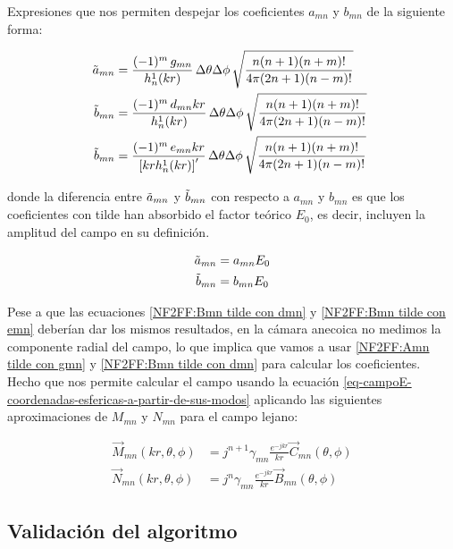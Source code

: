 \newpage

Expresiones que nos permiten despejar los coeficientes $a_{mn}$ y $b_{mn}$ de la siguiente forma:

\begin{align}
    \Tilde{a}_{mn} &= \frac{(-1)^m \, g_{mn}}{h^{1}_n(k r)} \,\Delta\theta \Delta\phi \, \sqrt{\frac{n(n + 1)(n + m)!}{4\pi(2n + 1)(n - m)!}}\ \label{NF2FF:Amn tilde con gmn} \\
\Tilde{b}_{mn} &= \frac{(-1)^m \, d_{mn} kr}{h^{1}_n(k r)} \,\Delta\theta \Delta\phi \, \sqrt{\frac{n(n + 1)(n + m)!}{4\pi(2n + 1)(n - m)!}}\ \label{NF2FF:Bmn tilde con dmn} \\
\Tilde{b}_{mn} &= \frac{(-1)^m \, e_{mn} kr}{\left[kr h^{1}_n(kr)\right]'} \,\Delta\theta \Delta\phi \, \sqrt{\frac{n(n + 1)(n + m)!}{4\pi(2n + 1)(n - m)!}}\ \label{NF2FF:Bmn tilde con emn} 
\end{align}

\noindent
donde la diferencia entre $\Tilde{a}_{mn}$ y $\Tilde{b}_{mn}$ con respecto a $a_{mn}$ y $b_{mn}$ es que los coeficientes con tilde han absorbido el factor teórico $E_0$, es decir, incluyen la amplitud del campo en su definición.

\begin{align}
    \Tilde{a}_{mn} &= a_{mn} E_{0} \\
    \Tilde{b}_{mn} &= b_{mn} E_{0}
\end{align}

\noindent
Pese a que las ecuaciones \eqref{NF2FF:Bmn tilde con dmn} y \eqref{NF2FF:Bmn tilde con emn} deberían dar los mismos resultados, en la cámara anecoica no medimos la componente radial del campo, lo que implica que vamos a usar \eqref{NF2FF:Amn tilde con gmn} y \eqref{NF2FF:Bmn tilde con dmn} para calcular los coeficientes. Hecho que nos permite calcular el campo usando la ecuación \eqref{eq-campoE-coordenadas-esfericas-a-partir-de-sus-modos} aplicando las siguientes aproximaciones de $M_{mn}$ y $N_{mn}$ para el campo lejano:

\begin{align}
\vec{M}_{mn}(kr, \theta, \phi) &= j^{n+1} \gamma_{mn} \frac{e^{-jkr}}{kr} \vec{C}_{mn}(\theta, \phi) \label{NF2FF:Mmn campo lejano} \\
 \vec{N}_{mn}(kr, \theta, \phi) &= j^{n} \gamma_{mn} \frac{e^{-jkr}}{kr} \vec{B}_{mn}(\theta, \phi) \label{NF2FF:Nmn campo lejano}
\end{align}

\subsection{Validación del algoritmo}

